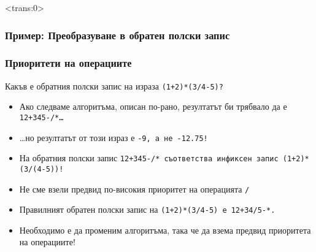 \documentclass[alsotrans, beameroptions={aspectratio=169}]{beamerswitch}
\begin{document}
\begin{frame}<trans:0>
  \frametitle{Пример: Преобразуване в обратен полски запис}

  \begin{center}
  \end{center}
\end{frame}

\begin{frame}
  \frametitle{Приоритети на операциите}
  Какъв е обратния полски запис на израза \tt{(1+2)*(3/4-5)}?
  \begin{itemize}[<+->]
  \item Ако следваме алгоритъма, описан по-рано, резултатът би трябвало да е \tt{12+345-/*}\ldots
  \item \ldots \alert{но резултатът от този израз е \tt{-9}, а не \tt{-12.75}!}
  \item На обратния полски запис \tt{12+345-/*} съответства инфиксен запис \tt{(1+2)*(3/(4-5))}!
  \item \alert{Не сме взели предвид по-високия приоритет на операцията \tt/}
  \item Правилният обратен полски запис на \tt{(1+2)*(3/4-5)} е \tt{12+34/5-*}.
  \item \alert{Необходимо е да променим алгоритъма, така че да взема предвид приоритета на операциите!}
  \end{itemize}
\end{frame}
\end{document}
